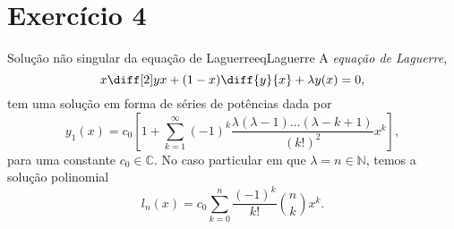 \section*{Exercício 4}
\begin{proposition}{Solução não singular da equação de Laguerre}{eqLaguerre}
    A \emph{equação de Laguerre},
    \begin{equation*}
        x\diff[2]yx + (1-x)\diff{y}{x} + \lambda y(x) = 0,
    \end{equation*}
    tem uma solução em forma de séries de potências dada por
    \begin{equation*}
        y_1(x) = c_0\left[1 + \sum_{k = 1}^\infty (-1)^k \frac{\lambda(\lambda-1)\dots(\lambda - k + 1)}{(k!)^2}x^k\right],
    \end{equation*}
    para uma constante \(c_0 \in \mathbb{C}\). No caso particular em que \(\lambda = n \in \mathbb{N}\), temos a solução polinomial
    \begin{equation*}
        l_n(x) = c_0 \sum_{k = 0}^n \frac{(-1)^k}{k!}\binom{n}{k}x^k.
    \end{equation*}
\end{proposition}
